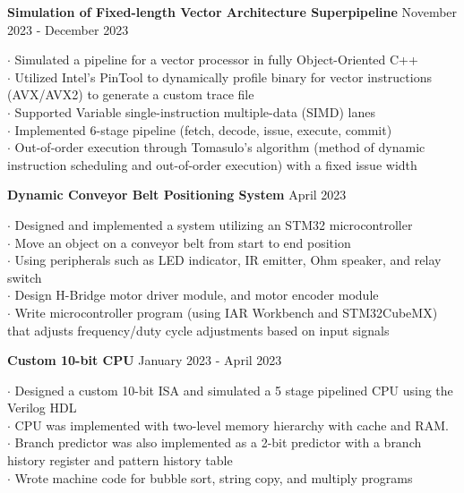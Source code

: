 \documentclass[letter,12pt]{article}
\begin{document}
\vspace{-.125cm}
\begin{tcolorbox}
[colback=gray!25,
  leftrule=0pt,
  rightrule=0pt,
  sharp corners]
\noindent\textbf{Simulation of Fixed-length Vector Architecture Superpipeline}
\hfill November 2023 - December 2023
\end{tcolorbox}
\noindent
$\cdot$ Simulated a pipeline for a vector processor in fully Object-Oriented C++\\
$\cdot$ Utilized Intel's PinTool to dynamically profile binary for vector instructions (AVX/AVX2) to generate a custom trace file\\
$\cdot$ Supported Variable single-instruction multiple-data (SIMD) lanes\\
$\cdot$ Implemented 6-stage pipeline (fetch, decode, issue, execute, commit)\\
$\cdot$ Out-of-order execution through Tomasulo's algorithm (method of dynamic
instruction scheduling and out-of-order execution)
with a fixed issue width\\

\vspace{-.5cm}
\begin{tcolorbox}
[colback=gray!25,
  leftrule=0pt,
  rightrule=0pt,
  sharp corners]
\noindent\textbf{Dynamic Conveyor Belt Positioning System} 
  \hfill April 2023 
\end{tcolorbox}
\noindent
$\cdot$ Designed and implemented a system utilizing an STM32 microcontroller \\
$\cdot$ Move an object on a conveyor belt from start to end position \\
$\cdot$ Using peripherals such as LED indicator, IR emitter, Ohm speaker, and relay switch\\
$\cdot$ Design H-Bridge motor driver module, and motor encoder module \\
$\cdot$ Write microcontroller program (using IAR Workbench and STM32CubeMX) 
that adjusts frequency/duty cycle adjustments based on input signals \\

\vspace{-.5cm}

\begin{tcolorbox}
[colback=gray!25,
  leftrule=0pt,
  rightrule=0pt,
  sharp corners]
\textbf{Custom 10-bit CPU} 
\hfill January 2023 - April 2023 
\end{tcolorbox}
\noindent
$\cdot$ Designed a custom 10-bit ISA and simulated a 5 stage pipelined CPU using the Verilog HDL \\
$\cdot$ CPU was implemented with two-level memory hierarchy with cache and RAM. \\
$\cdot$ Branch predictor was also implemented as a 2-bit predictor with a branch history register and
pattern history table\\
$\cdot$ Wrote machine code for bubble sort, string copy, and multiply programs
\vspace{-.75cm}
\end{document}
